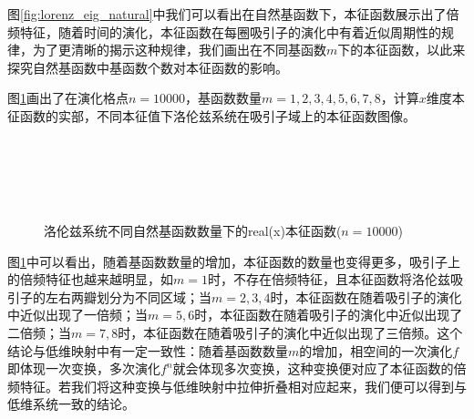 图\ref{fig:lorenz_eig_natural}中我们可以看出在自然基函数下，本征函数展示出了倍频特征，随着时间的演化，本征函数在每圈吸引子的演化中有着近似周期性的规律，为了更清晰的揭示这种规律，我们画出在不同基函数$m$下的本征函数，以此来探究自然基函数中基函数个数对本征函数的影响。

图\ref{fig:lorenz_eig_natural_real}画出了在演化格点$n=10000$，基函数数量$m=1,2,3,4,5,6,7,8$，计算$x$维度本征函数的实部，不同本征值下洛伦兹系统在吸引子域上的本征函数图像。

\begin{figure}
    \centering
    \\
    \\
    \\
    \\
    \caption{洛伦兹系统不同自然基函数数量下的real(x)本征函数($n=10000$)}\label{fig:lorenz_eig_natural_real}
\end{figure}

图\ref{fig:lorenz_eig_natural_real}中可以看出，随着基函数数量的增加，本征函数的数量也变得更多，吸引子上的倍频特征也越来越明显，如$m=1$时，不存在倍频特征，且本征函数将洛伦兹吸引子的左右两瓣划分为不同区域；当$m=2,3,4$时，本征函数在随着吸引子的演化中近似出现了一倍频；当$m=5,6$时，本征函数在随着吸引子的演化中近似出现了二倍频；当$m=7,8$时，本征函数在随着吸引子的演化中近似出现了三倍频。这个结论与低维映射中有一定一致性：随着基函数数量$m$的增加，相空间的一次演化$f$即体现一次变换，多次演化$f^n$就会体现多次变换，这种变换便对应了本征函数的倍频特征。若我们将这种变换与低维映射中拉伸折叠相对应起来，我们便可以得到与低维系统一致的结论。

